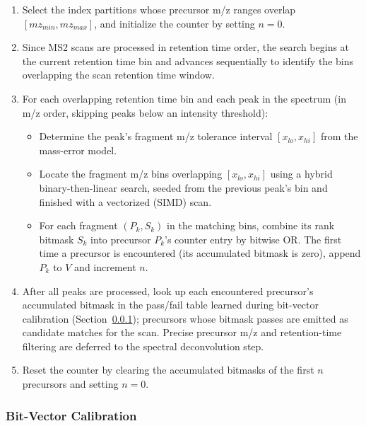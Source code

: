 \documentclass[pdflatex,sn-nature]{sn-jnl}
\begin{document}
\begin{enumerate}

\item Select the index partitions whose precursor m/z ranges overlap $[mz_{min}, mz_{max}]$, and initialize the counter by setting $n = 0$.

\item Since MS2 scans are processed in retention time order, the search begins at the current retention time bin and advances sequentially to identify the bins overlapping the scan retention time window.

\item For each overlapping retention time bin and each peak in the spectrum (in m/z order, skipping peaks below an intensity threshold):
    \begin{itemize}
        \item Determine the peak's fragment m/z tolerance interval $[x_{lo}, x_{hi}]$ from the mass-error model.
        \item Locate the fragment m/z bins overlapping $[x_{lo}, x_{hi}]$ using a hybrid binary-then-linear search, seeded from the previous peak's bin and finished with a vectorized (SIMD) scan.
        \item For each fragment $(P_k, S_k)$ in the matching bins, combine its rank bitmask $S_k$ into precursor $P_k$'s counter entry by bitwise OR. The first time a precursor is encountered (its accumulated bitmask is zero), append $P_k$ to $V$ and increment $n$.
    \end{itemize}

\item After all peaks are processed, look up each encountered precursor's accumulated bitmask in the pass/fail table learned during bit-vector calibration (Section~\ref{subsubsec:bitvec-calibration}); precursors whose bitmask passes are emitted as candidate matches for the scan. Precise precursor m/z and retention-time filtering are deferred to the spectral deconvolution step.

\item Reset the counter by clearing the accumulated bitmasks of the first $n$ precursors and setting $n = 0$.

\end{enumerate}

\subsubsection{Bit-Vector Calibration}\label{subsubsec:bitvec-calibration}
\end{document}
